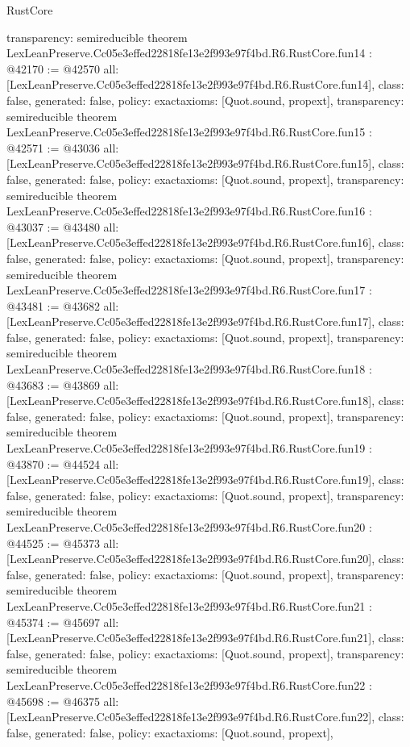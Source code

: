 \begin{lexlean}{RustCore}
\begin{coremodule}
{  transparency: semireducible
}
theorem LexLeanPreserve.Cc05e3effed22818fe13e2f993e97f4bd.R6.RustCore.fun14 : @42170 := @42570 {
  all: [LexLeanPreserve.Cc05e3effed22818fe13e2f993e97f4bd.R6.RustCore.fun14],
  class: false,
  generated: false,
  policy: exact{axioms: [Quot.sound, propext]},
  transparency: semireducible
}
theorem LexLeanPreserve.Cc05e3effed22818fe13e2f993e97f4bd.R6.RustCore.fun15 : @42571 := @43036 {
  all: [LexLeanPreserve.Cc05e3effed22818fe13e2f993e97f4bd.R6.RustCore.fun15],
  class: false,
  generated: false,
  policy: exact{axioms: [Quot.sound, propext]},
  transparency: semireducible
}
theorem LexLeanPreserve.Cc05e3effed22818fe13e2f993e97f4bd.R6.RustCore.fun16 : @43037 := @43480 {
  all: [LexLeanPreserve.Cc05e3effed22818fe13e2f993e97f4bd.R6.RustCore.fun16],
  class: false,
  generated: false,
  policy: exact{axioms: [Quot.sound, propext]},
  transparency: semireducible
}
theorem LexLeanPreserve.Cc05e3effed22818fe13e2f993e97f4bd.R6.RustCore.fun17 : @43481 := @43682 {
  all: [LexLeanPreserve.Cc05e3effed22818fe13e2f993e97f4bd.R6.RustCore.fun17],
  class: false,
  generated: false,
  policy: exact{axioms: [Quot.sound, propext]},
  transparency: semireducible
}
theorem LexLeanPreserve.Cc05e3effed22818fe13e2f993e97f4bd.R6.RustCore.fun18 : @43683 := @43869 {
  all: [LexLeanPreserve.Cc05e3effed22818fe13e2f993e97f4bd.R6.RustCore.fun18],
  class: false,
  generated: false,
  policy: exact{axioms: [Quot.sound, propext]},
  transparency: semireducible
}
theorem LexLeanPreserve.Cc05e3effed22818fe13e2f993e97f4bd.R6.RustCore.fun19 : @43870 := @44524 {
  all: [LexLeanPreserve.Cc05e3effed22818fe13e2f993e97f4bd.R6.RustCore.fun19],
  class: false,
  generated: false,
  policy: exact{axioms: [Quot.sound, propext]},
  transparency: semireducible
}
theorem LexLeanPreserve.Cc05e3effed22818fe13e2f993e97f4bd.R6.RustCore.fun20 : @44525 := @45373 {
  all: [LexLeanPreserve.Cc05e3effed22818fe13e2f993e97f4bd.R6.RustCore.fun20],
  class: false,
  generated: false,
  policy: exact{axioms: [Quot.sound, propext]},
  transparency: semireducible
}
theorem LexLeanPreserve.Cc05e3effed22818fe13e2f993e97f4bd.R6.RustCore.fun21 : @45374 := @45697 {
  all: [LexLeanPreserve.Cc05e3effed22818fe13e2f993e97f4bd.R6.RustCore.fun21],
  class: false,
  generated: false,
  policy: exact{axioms: [Quot.sound, propext]},
  transparency: semireducible
}
theorem LexLeanPreserve.Cc05e3effed22818fe13e2f993e97f4bd.R6.RustCore.fun22 : @45698 := @46375 {
  all: [LexLeanPreserve.Cc05e3effed22818fe13e2f993e97f4bd.R6.RustCore.fun22],
  class: false,
  generated: false,
  policy: exact{axioms: [Quot.sound, propext]},
}
\end{coremodule}
\end{lexlean}
